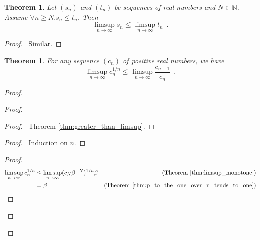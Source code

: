 \documentclass{book}
\let\qed\relax
\newtheorem{thm}[prop]{Theorem}
\theoremstyle{definition}
\begin{document}
\begin{thm}
\label{thm:limsup_monotone}
Let $(s_n)$ and $(t_n)$ be sequences of real numbers and $N \in \mathbb{N}$. Assume $\forall n \geq N. s_n \leq t_n$. Then
\[ \limsup_{n \rightarrow \infty} s_n \leq \limsup_{n \rightarrow \infty} t_n \enspace . \]
\end{thm}

\begin{proof}
\pf\ Similar. \qed
\end{proof}

\begin{thm}
\label{thm:limsups_compared}
For any sequence $(c_n)$ of positive real numbers, we have
\[ \limsup_{n \rightarrow \infty} c_n^{1/n} \leq \limsup_{n \rightarrow \infty} \frac{c_{n+1}}{c_n} \enspace . \]
\end{thm}

\begin{proof}
\pf
{}
\begin{proof}
	\begin{proof}
		\pf\ Theorem \ref{thm:greater_than_limsup}.
	\end{proof}
	\begin{proof}
		\pf\ Induction on $n$.
	\end{proof}
	\begin{proof}
		\pf
		\begin{align*}
			\limsup_{n \rightarrow \infty} c_n^{1/n} & \leq \limsup_{n \rightarrow \infty} (c_N \beta^{-N})^{1/n} \beta & (\text{Theorem \ref{thm:limsup_monotone}}) \\
			& = \beta & (\text{Theorem \ref{thm:p_to_the_one_over_n_tends_to_one}})
		\end{align*}
	\end{proof}
\end{proof}
\qed
\end{proof}
\end{document}
